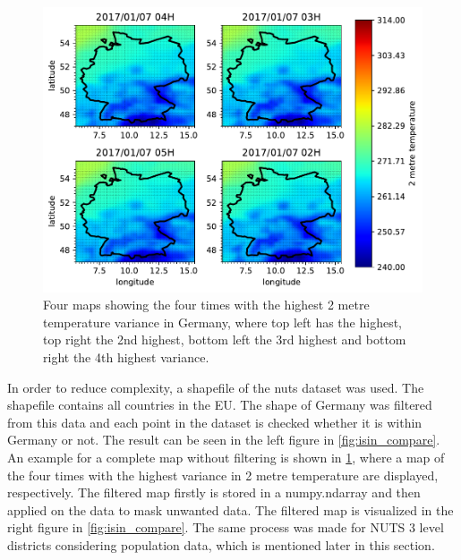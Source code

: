 

\begin{figure}[h!]%
\centering
\includegraphics[width=\textwidth]{plots/t2m/bundles/maxvar4_maps}%
\caption{Four maps showing the four times with the highest 2 metre temperature variance in Germany, where top left has the highest, top right the 2nd highest, bottom left the 3rd highest and bottom right the 4th highest variance.}%
\label{fig:maxvar4_maps}%
\end{figure}

In order to reduce complexity, a shapefile of the \acrshort{nuts} dataset was used. The shapefile contains all countries in the EU. The shape of Germany was filtered from this data and each point in the dataset is checked whether it is within Germany or not. The result can be seen in the left figure in \cref{fig:isin_compare}. An example for a complete map without filtering is shown in \cref{fig:maxvar4_maps}, where a map of the four times with the highest variance in 2 metre temperature are displayed, respectively. The filtered map firstly is stored in a numpy.ndarray and then applied on the data to mask unwanted data. The filtered map is visualized in the right figure in \cref{fig:isin_compare}. The same process was made for NUTS 3 level districts considering population data, which is mentioned later in this section.\\

